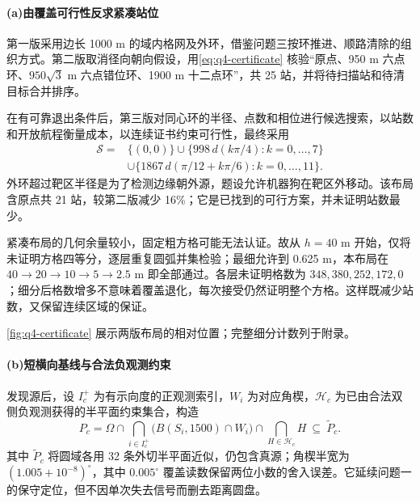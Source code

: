 \paragraph{\textbf{(a)}\hspace{0.2em}由覆盖可行性反求紧凑站位}
第一版采用边长 1000 m 的域内格网及外环，借鉴问题三按环推进、顺路清除的组织方式。第二版取消径向朝向假设，用\cref{eq:q4-certificate} 核验“原点、950 m 六点环、$950\sqrt3$ m 六点错位环、1900 m 十二点环”，共 25 站，并将待扫描站和待清目标合并排序。

在有可靠退出条件后，第三版对同心环的半径、点数和相位进行候选搜索，以站数和开放航程衡量成本，以连续证书约束可行性，最终采用
\begin{equation}\label{eq:q4-layout}
 \begin{aligned}
 \mathcal S={}&\{(0,0)\}\cup\{998\,d(k\pi/4):k=0,\ldots,7\}\\
 &\cup\{1867\,d(\pi/12+k\pi/6):k=0,\ldots,11\}.
 \end{aligned}
\end{equation}
外环超过靶区半径是为了检测边缘朝外源，题设允许机器狗在靶区外移动。该布局含原点共 21 站，较第二版减少 16\%；它是已找到的可行方案，并未证明站数最少。

紧凑布局的几何余量较小，固定粗方格可能无法认证。故从 $h=40$ m 开始，仅将未证明方格四等分，逐层重复圆弧并集检验；最细允许到 0.625 m，本布局在 $40\to20\to10\to5\to2.5$ m 即全部通过。各层未证明格数为 $348,380,252,172,0$；细分后格数增多不意味着覆盖退化，每次接受仍然证明整个方格。这样既减少站数，又保留连续区域的保证。

\cref{fig:q4-certificate} 展示两版布局的相对位置；完整细分计数列于附录。

\paragraph{\textbf{(b)}\hspace{0.2em}短横向基线与合法负观测约束}
发现源后，设 $I_c^+$ 为有示向度的正观测索引，$W_i$ 为对应角楔，$\mathcal H_c$ 为已由合法双侧负观测获得的半平面约束集合，构造
\begin{equation}\label{eq:q4-region}
 P_c=\Omega\cap\bigcap_{i\in I_c^+}\bigl(B(S_i,1500)\cap W_i\bigr)
       \cap\bigcap_{H\in\mathcal H_c}H\ \subseteq\ \widetilde P_c.
\end{equation}
其中 $\widetilde P_c$ 将圆域各用 32 条外切半平面近似，仍包含真源；角楔半宽为 $(1.005+10^{-8})^\circ$，其中 $0.005^\circ$ 覆盖读数保留两位小数的舍入误差。它延续问题一的保守定位，但不因单次失去信号而删去距离圆盘。

